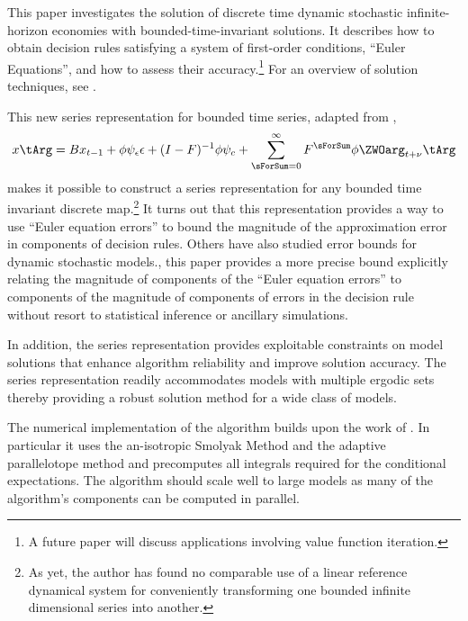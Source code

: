 \documentclass[12pt]{article}
\begin{document}
This paper investigates the solution of discrete time  dynamic stochastic
infinite-horizon economies with bounded-time-invariant solutions.
It describes how to obtain decision rules satisfying a system of 
first-order conditions, ``Euler Equations'',  and how to assess their accuracy.\footnote{A future paper will 
discuss  applications involving value function iteration.}
 For an overview of solution techniques,
see \citep{judd92,Christiano2000,doraszelskiy04,gaspar97,Judd2014,marcet.lorenzoni99,juddGSSA2011,maliarmovingbounds,RePEc:bny:wpaper:0058}.


This new series representation for bounded time series, adapted from \citep{anderson10},
\begin{gather*}
      	 x\tArg =B x_{t-1}+ \phi \psi_\epsilon\epsilon + (I - F)^{-1} \phi \psi_c + \sum_{\sForSum=0}^\infty F^\sForSum \phi \ZWOarg_{t+\nu}\tArg%
    \end{gather*}
 makes it possible to  construct a series
    representation for any bounded time invariant discrete map.\footnote{As yet, the author has found no comparable use of a
linear reference dynamical system for  conveniently transforming
one bounded infinite dimensional series into another.
}
    It turns out that this representation provides a way to use
    ``Euler equation errors'' to
    bound the magnitude of the    approximation error in components of 
    decision rules.
    Others have also studied error bounds for dynamic stochastic models.\cite{judd2017lower,santos2005accuracy,Santos2000accuracy}, this paper provides a more precise bound 
    explicitly relating the magnitude of components of the
    ``Euler equation errors'' to components of the magnitude of components of
    errors in the decision rule without resort to statistical inference or ancillary simulations.

    In addition, the series representation provides exploitable
    constraints on model solutions that enhance  
    algorithm reliability and improve solution accuracy.
    The series representation readily accommodates models with
    multiple ergodic sets
    thereby providing a robust solution method for a wide class of models.


The numerical implementation of the algorithm 
builds upon the work of
\citep{juddGSSA2011}.
In particular it uses
the an-isotropic Smolyak Method and the adaptive
parallelotope method\citep{Judd2014}
and precomputes all integrals required for the conditional expectations.
The algorithm should scale well to large models as many 
of the algorithm's components can be computed in parallel.
\end{document}
